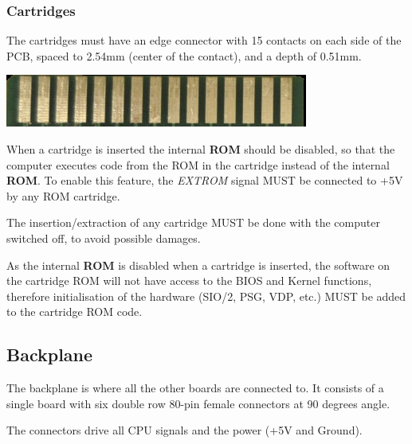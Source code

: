 \documentclass[a4paper,11pt]{article}
\begin{document}
        \subsubsection{Cartridges}

        The cartridges must have an edge connector with 15 contacts on each side
        of the PCB, spaced to 2.54mm (center of the contact), and a depth of
        0.51mm.

        \includegraphics[scale=0.6]{images/cartridgeedge.png}

        When a cartridge is inserted the internal \textbf{ROM} should be
        disabled, so that the computer executes code from the ROM in the
        cartridge instead of the internal \textbf{ROM}. To enable this feature,
        the \textit{EXTROM} signal MUST be connected to +5V by any ROM cartridge.

        The insertion/extraction of any cartridge MUST be done with the
        computer switched off, to avoid possible damages.

        As the internal \textbf{ROM} is disabled when a cartridge is inserted,
        the software on the cartridge ROM will not have access to the BIOS and
        Kernel functions, therefore initialisation of the hardware (SIO/2, PSG,
        VDP, etc.) MUST be added to the cartridge ROM code.

    \subsection{Backplane}

    The backplane is where all the other boards are connected to. It consists
    of a single board with six double row 80-pin female connectors at 90 degrees
    angle.

    The connectors drive all CPU signals and the power (+5V and Ground).

\end{document}
